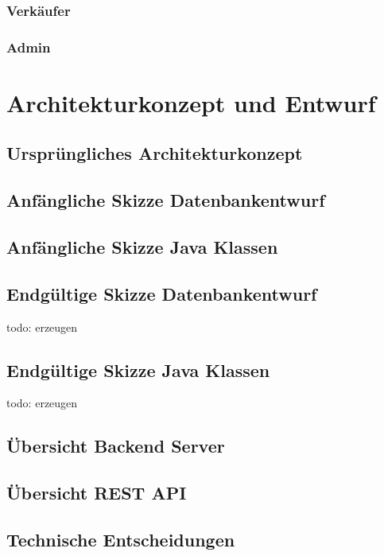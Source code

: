 \documentclass{scrartcl}
\begin{document}
\subsubsection{Verkäufer}

\subsubsection{Admin}

\newpage

\section{Architekturkonzept und Entwurf}

\subsection{Ursprüngliches Architekturkonzept}

\subsection{Anfängliche Skizze Datenbankentwurf}

\subsection{Anfängliche Skizze Java Klassen}

\subsection{Endgültige Skizze Datenbankentwurf}
todo: erzeugen

\subsection{Endgültige Skizze Java Klassen}
todo: erzeugen

\subsection{Übersicht Backend Server}

\subsection{Übersicht REST API}

\subsection{Technische Entscheidungen}
\end{document}
